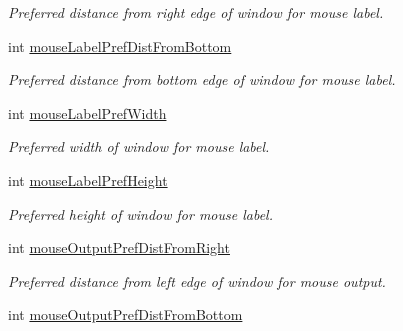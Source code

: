 \begin{DoxyCompactItemize}
\begin{DoxyCompactList}\small\item\em Preferred distance from right edge of window for mouse label. \end{DoxyCompactList}\item 
\hypertarget{class_three_d_viewer_af86803483382c6f283c9d211820e75ef}{
int \hyperlink{class_three_d_viewer_af86803483382c6f283c9d211820e75ef}{mouseLabelPrefDistFromBottom}}
\label{class_three_d_viewer_af86803483382c6f283c9d211820e75ef}

\begin{DoxyCompactList}\small\item\em Preferred distance from bottom edge of window for mouse label. \end{DoxyCompactList}\item 
\hypertarget{class_three_d_viewer_a9127e9e8aa38bee0daa616066fb64130}{
int \hyperlink{class_three_d_viewer_a9127e9e8aa38bee0daa616066fb64130}{mouseLabelPrefWidth}}
\label{class_three_d_viewer_a9127e9e8aa38bee0daa616066fb64130}

\begin{DoxyCompactList}\small\item\em Preferred width of window for mouse label. \end{DoxyCompactList}\item 
\hypertarget{class_three_d_viewer_a0a075e8859f3a085846a2d009e88a726}{
int \hyperlink{class_three_d_viewer_a0a075e8859f3a085846a2d009e88a726}{mouseLabelPrefHeight}}
\label{class_three_d_viewer_a0a075e8859f3a085846a2d009e88a726}

\begin{DoxyCompactList}\small\item\em Preferred height of window for mouse label. \end{DoxyCompactList}\item 
\hypertarget{class_three_d_viewer_aa188aca632c5e1856711e329c66900c1}{
int \hyperlink{class_three_d_viewer_aa188aca632c5e1856711e329c66900c1}{mouseOutputPrefDistFromRight}}
\label{class_three_d_viewer_aa188aca632c5e1856711e329c66900c1}

\begin{DoxyCompactList}\small\item\em Preferred distance from left edge of window for mouse output. \end{DoxyCompactList}\item 
\hypertarget{class_three_d_viewer_ab03d0a66af25f5efba7b59d542130154}{
int \hyperlink{class_three_d_viewer_ab03d0a66af25f5efba7b59d542130154}{mouseOutputPrefDistFromBottom}}
\label{class_three_d_viewer_ab03d0a66af25f5efba7b59d542130154}


\end{DoxyCompactItemize}
